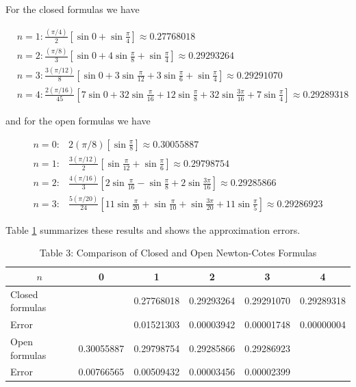 \begin{mysolution}
For the closed formulas we have

$$
\begin{aligned}
& n=1: \frac{(\pi / 4)}{2}\left[\sin 0+\sin \frac{\pi}{4}\right] \approx 0.27768018 \\
& n=2: \frac{(\pi / 8)}{3}\left[\sin 0+4 \sin \frac{\pi}{8}+\sin \frac{\pi}{4}\right] \approx 0.29293264 \\
& n=3: \frac{3(\pi / 12)}{8}\left[\sin 0+3 \sin \frac{\pi}{12}+3 \sin \frac{\pi}{6}+\sin \frac{\pi}{4}\right] \approx 0.29291070 \\
& n=4: \frac{2(\pi / 16)}{45}\left[7 \sin 0+32 \sin \frac{\pi}{16}+12 \sin \frac{\pi}{8}+32 \sin \frac{3 \pi}{16}+7 \sin \frac{\pi}{4}\right] \approx 0.29289318
\end{aligned}
$$

and for the open formulas we have

$$
\begin{array}{ll}
n=0: & 2(\pi / 8)\left[\sin \frac{\pi}{8}\right] \approx 0.30055887 \\
n=1: & \frac{3(\pi / 12)}{2}\left[\sin \frac{\pi}{12}+\sin \frac{\pi}{6}\right] \approx 0.29798754 \\
n=2: & \frac{4(\pi / 16)}{3}\left[2 \sin \frac{\pi}{16}-\sin \frac{\pi}{8}+2 \sin \frac{3 \pi}{16}\right] \approx 0.29285866 \\
n=3: & \frac{5(\pi / 20)}{24}\left[11 \sin \frac{\pi}{20}+\sin \frac{\pi}{10}+\sin \frac{3 \pi}{20}+11 \sin \frac{\pi}{5}\right] \approx 0.29286923
\end{array}
$$
\end{mysolution}
Table \ref{tab:intcomp} summarizes these results and shows the approximation errors.
%
%
\begin{table}[h]
\centering
\begin{tabular}{lccccc}
\hline
\multicolumn{1}{c}{$n$} & 0 & 1 & 2 & 3 & 4 \\
\hline
Closed formulas &  & 0.27768018 & 0.29293264 & 0.29291070 & 0.29289318 \\
Error &  & 0.01521303 & 0.00003942 & 0.00001748 & 0.00000004 \\
Open formulas & 0.30055887 & 0.29798754 & 0.29285866 & 0.29286923 &  \\
Error & 0.00766565 & 0.00509432 & 0.00003456 & 0.00002399 &  \\
\hline
\end{tabular}
\caption{\scriptsize Table 3: Comparison of Closed and Open Newton-Cotes Formulas}
\label{tab:intcomp}
\end{table}

